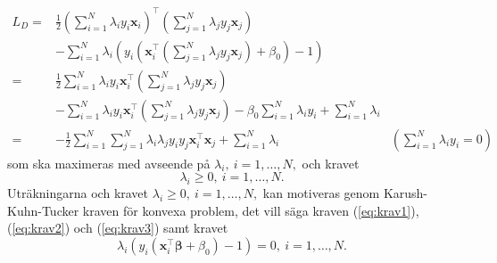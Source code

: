 \documentclass[a4paper, 12pt]{report}
\theoremstyle{definition}
\theoremstyle{remark}
\newcommand{\bfbeta}{{\boldsymbol{\beta}}}
\begin{document}
\begin{equation*}
\begin{aligned}
	L_D=&\frac{1}{2}\left(\sum_{i=1}^{N}\lambda_i y_i \mathbf{x}_i\right)^\intercal \left(\sum_{j=1}^{N}\lambda_j y_j \mathbf{x}_j\right)&\\
	&- \sum_{i=1}^{N}\lambda_i \left(y_i\left(\mathbf{x}_i^\intercal \left(\sum_{j=1}^{N} \lambda_j y_j \mathbf{x}_j\right) +\beta_0 \right) -1\right)&\\
	=& \frac{1}{2} \sum_{i=1}^{N} \lambda_i y_i \mathbf{x}_i^\intercal\left(\sum_{j=1}^{N} \lambda_j y_j \mathbf{x}_j\right) &\\
	&- \sum_{i=1}^{N}\lambda_i y_i \mathbf{x}_i^\intercal \left(\sum_{j=1}^{N} \lambda_j y_j \mathbf{x}_j\right) - \beta_0 \sum_{i=1}^{N} \lambda_i y_i  + \sum_{i=1}^{N} \lambda_i&\\
	=& -\frac{1}{2} \sum_{i=1}^{N} \sum_{j=1}^{N} \lambda_i \lambda_j y_i y_j \mathbf{x}_i^\intercal \mathbf{x}_j + \sum_{i=1}^{N} \lambda_i &\textstyle{\left(\sum\limits_{i=1}^{N}\lambda_iy_i = 0\right)}
\end{aligned}
\end{equation*}
som ska maximeras med avseende på $\lambda_i,~i=1,\dots,N,$ och kravet \begin{equation}\label{eq:krav3}
	\lambda_i\geq 0,~i=1,\dots,N.
\end{equation} Uträkningarna och kravet $\lambda_i\geq 0,~i=1,\dots,N,$ kan motiveras genom Karush-Kuhn-Tucker kraven \cite{Boyd} för konvexa problem, det vill säga kraven (\ref{eq:krav1}), (\ref{eq:krav2}) och (\ref{eq:krav3}) samt kravet
\begin{equation}\label{eq:krav4}
	\lambda_i\left( y_i\left( \mathbf{x}_i^\intercal \bfbeta + \beta_0 \right) -1 \right) = 0,~i=1,\dots, N.
\end{equation}
\end{document}
